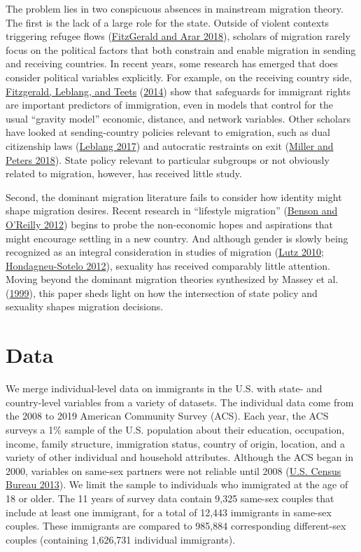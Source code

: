 \documentclass[
  11pt,
]{article}
\begin{document}
The problem lies in two conspicuous absences in mainstream migration theory. The first is the lack of a large role for the state. Outside of violent contexts triggering refugee flows (\protect\hyperlink{ref-fitzgerald_2018}{FitzGerald and Arar 2018}), scholars of migration rarely focus on the political factors that both constrain and enable migration in sending and receiving countries. In recent years, some research has emerged that does consider political variables explicitly. For example, on the receiving country side, \protect\hyperlink{ref-fitzgerald_2014}{Fitzgerald, Leblang, and Teets} (\protect\hyperlink{ref-fitzgerald_2014}{2014}) show that safeguards for immigrant rights are important predictors of immigration, even in models that control for the usual ``gravity model'' economic, distance, and network variables. Other scholars have looked at sending-country policies relevant to emigration, such as dual citizenship laws (\protect\hyperlink{ref-leblang_2017}{Leblang 2017}) and autocratic restraints on exit (\protect\hyperlink{ref-miller_2018}{Miller and Peters 2018}). State policy relevant to particular subgroups or not obviously related to migration, however, has received little study.

Second, the dominant migration literature fails to consider how identity might shape migration desires. Recent research in ``lifestyle migration'' (\protect\hyperlink{ref-benson_2012}{Benson and O'Reilly 2012}) begins to probe the non-economic hopes and aspirations that might encourage settling in a new country. And although gender is slowly being recognized as an integral consideration in studies of migration (\protect\hyperlink{ref-lutz_2010}{Lutz 2010}; \protect\hyperlink{ref-hondagneu-sotelo_2012}{Hondagneu-Sotelo 2012}), sexuality has received comparably little attention. Moving beyond the dominant migration theories synthesized by Massey et al. (\protect\hyperlink{ref-massey_1999}{1999}), this paper sheds light on how the intersection of state policy and sexuality shapes migration decisions.

\hypertarget{data}{%
\section{Data}\label{data}}

We merge individual-level data on immigrants in the U.S. with state- and country-level variables from a variety of datasets. The individual data come from the 2008 to 2019 American Community Survey (ACS). Each year, the ACS surveys a 1\% sample of the U.S. population about their education, occupation, income, family structure, immigration status, country of origin, location, and a variety of other individual and household attributes. Although the ACS began in 2000, variables on same-sex partners were not reliable until 2008 (\protect\hyperlink{ref-u.s.censusbureau_2013}{U.S. Census Bureau 2013}). We limit the sample to individuals who immigrated at the age of 18 or older. The 11 years of survey data contain 9,325 same-sex couples that include at least one immigrant, for a total of 12,443 immigrants in same-sex couples. These immigrants are compared to 985,884 corresponding different-sex couples (containing 1,626,731 individual immigrants).
\end{document}
